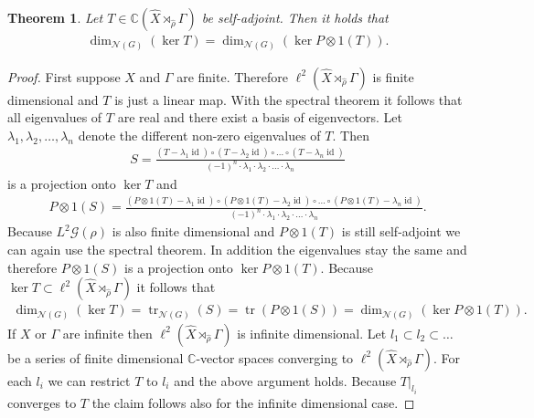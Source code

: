 \documentclass[12pt,a4paper]{scrartcl}
\theoremstyle{plain}
\newtheorem{Theorem}{Theorem}[section]
\theoremstyle{definition}
\numberwithin{equation}{section}
\newcommand{\C}{\mathbb{C}} %
\newcommand{\2}{\mathbb{Z} / 2 \mathbb{Z}}
\newcommand{\G}{\mathcal{G}}
\newcommand{\1}{\bar{1}}
\newcommand{\0}{\bar{0}}
\newcommand{\tr}{\operatorname{tr}}
\newcommand{\id}{\operatorname{id}}
\begin{document}
\begin{Theorem} \label{pontr_vNd}
	Let $T \in \C(\hat{X} \rtimes_{\hat{\rho}} \Gamma)$ be self-adjoint. Then it holds that
	\begin{align*}
		\dim_{\mathcal{N}(G)}(\ker T) = \dim_{\mathcal{N}(G)}(\ker P \otimes 1(T)).
	\end{align*}
\end{Theorem} 
\begin{proof}
	First suppose $X$ and $\Gamma$ are finite. Therefore $\ell^2(\hat{X} \rtimes_{\hat{\rho}} \Gamma)$ is finite dimensional and $T$ is just a linear map. With the spectral theorem it follows that all eigenvalues of $T$ are real and there exist a basis of eigenvectors. Let $\lambda_1, \lambda_2, \ldots, \lambda_n$ denote the different non-zero eigenvalues of $T$. Then
	\begin{align*}
		S = \frac{(T - \lambda_1 \id) \circ (T - \lambda_2 \id) \circ \ldots \circ (T - \lambda_n \id)}{(-1)^n \cdot \lambda_1 \cdot \lambda_2 \cdot \ldots \cdot \lambda_n}
	\end{align*}
	is a projection onto $\ker T$ and 
	\begin{align*}
		P \otimes 1 (S) = \frac{(P \otimes 1(T) - \lambda_1 \id) \circ (P \otimes 1(T) - \lambda_2 \id) \circ \ldots \circ (P \otimes 1(T) - \lambda_n \id)}{(-1)^n \cdot \lambda_1 \cdot \lambda_2 \cdot \ldots \cdot \lambda_n}.
	\end{align*}
	Because $L^2 \G (\rho)$ is also finite dimensional and $P \otimes 1(T)$ is still self-adjoint we can again use the spectral theorem. In addition the eigenvalues stay the same and therefore $P \otimes 1 (S)$ is a projection onto $\ker P \otimes 1 (T)$. Because $\ker T \subset \ell^2(\hat{X} \rtimes_{\hat{\rho}} \Gamma) $ it follows that
	\begin{align*}
		\dim_{\mathcal{N}(G)}(\ker T) = \tr_{\mathcal{N}(G)}(S) = \tr(P \otimes 1 (S)) = \dim_{\mathcal{N}(G)}(\ker P \otimes 1 (T)).
	\end{align*}
	If $X$ or $\Gamma$ are infinite then $\ell^2(\hat{X} \rtimes_{\hat{\rho}} \Gamma)$ is infinite dimensional. Let $l_1 \subset l_2 \subset \ldots$ be a series of finite dimensional $\C$-vector spaces converging to $\ell^2(\hat{X} \rtimes_{\hat{\rho}} \Gamma)$. For each $l_i$ we can restrict $T$ to $l_i$ and the above argument holds. Because $T|_{l_i}$ converges to $T$ the claim follows also for the infinite dimensional case.
\end{proof}
\end{document}
